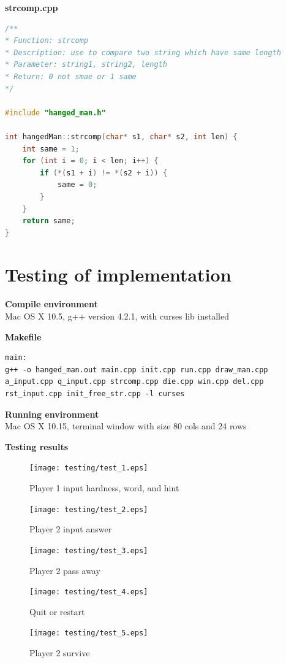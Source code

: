 \documentclass{article}
\begin{document}
        \textbf{strcomp.cpp}
        \begin{lstlisting}[language={cpp}]
/**
* Function: strcomp
* Description: use to compare two string which have same length
* Parameter: string1, string2, length
* Return: 0 not smae or 1 same
*/

#include "hanged_man.h"

int hangedMan::strcomp(char* s1, char* s2, int len) {
    int same = 1;
    for (int i = 0; i < len; i++) {
        if (*(s1 + i) != *(s2 + i)) {
            same = 0;
        }
    }
    return same;
}
        \end{lstlisting}
    
    \newpage
    \section{Testing of implementation}
        \textbf{Compile environment} \\
        Mac OS X 10.5, g++ version 4.2.1, with curses lib installed

        \textbf{Makefile} \\
        \begin{lstlisting}
main:
g++ -o hanged_man.out main.cpp init.cpp run.cpp draw_man.cpp a_input.cpp q_input.cpp strcomp.cpp die.cpp win.cpp del.cpp rst_input.cpp init_free_str.cpp -l curses
        \end{lstlisting}

        \textbf{Running environment} \\
        Mac OS X 10.15, terminal window with size 80 cols and 24 rows

        \textbf{Testing results}
        \begin{figure}[htbp]
            \centering
            \texttt{[image: testing/test\_1.eps]}
            \caption{Player 1 input hardness, word, and hint}
            \label{}
        \end{figure}

        \begin{figure}[htbp]
            \centering
            \texttt{[image: testing/test\_2.eps]}
            \caption{Player 2 input answer}
            \label{}
        \end{figure}

        \begin{figure}[htbp]
            \centering
            \texttt{[image: testing/test\_3.eps]}
            \caption{Player 2 pass away}
            \label{}
        \end{figure}

        \begin{figure}[htbp]
            \centering
            \texttt{[image: testing/test\_4.eps]}
            \caption{Quit or restart}
            \label{}
        \end{figure}

        \begin{figure}[htbp]
            \centering
            \texttt{[image: testing/test\_5.eps]}
            \caption{Player 2 survive}
            \label{}
        \end{figure}
\end{document}
